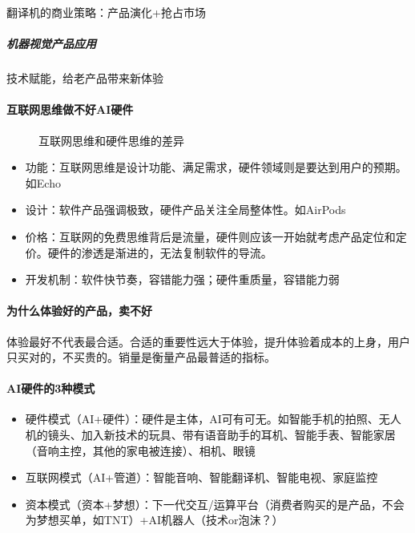 \documentclass[letterpaper,11pt,english]{sphinxmanual}
\begin{document}
翻译机的商业策略：产品演化+抢占市场


\subparagraph{机器视觉产品应用}
\label{\detokenize{chapter_project/AI_hardware:id12}}
技术赋能，给老产品带来新体验


\paragraph{互联网思维做不好AI硬件}
\label{\detokenize{chapter_project/AI_hardware:id13}}
\begin{figure}[H]
\centering
\capstart

\noindent{}
\caption{互联网思维和硬件思维的差异}\label{\detokenize{chapter_project/AI_hardware:id34}}\end{figure}
\begin{itemize}
\item {} 
功能：互联网思维是设计功能、满足需求，硬件领域则是要达到用户的预期。如Echo

\item {} 
设计：软件产品强调极致，硬件产品关注全局整体性。如AirPods

\item {} 
价格：互联网的免费思维背后是流量，硬件则应该一开始就考虑产品定位和定价。硬件的渗透是渐进的，无法复制软件的导流。

\item {} 
开发机制：软件快节奏，容错能力强；硬件重质量，容错能力弱

\end{itemize}


\paragraph{为什么体验好的产品，卖不好}
\label{\detokenize{chapter_project/AI_hardware:id14}}
体验最好不代表最合适。合适的重要性远大于体验，提升体验着成本的上身，用户只买对的，不买贵的。销量是衡量产品最普适的指标。


\paragraph{AI硬件的3种模式}
\label{\detokenize{chapter_project/AI_hardware:ai3}}\begin{itemize}
\item {} 
硬件模式（AI+硬件）：硬件是主体，AI可有可无。如智能手机的拍照、无人机的镜头、加入新技术的玩具、带有语音助手的耳机、智能手表、智能家居（音响主控，其他的家电被连接）、相机、眼镜

\item {} 
互联网模式（AI+管道）：智能音响、智能翻译机、智能电视、家庭监控

\item {} 
资本模式（资本+梦想）：下一代交互/运算平台（消费者购买的是产品，不会为梦想买单，如TNT）+AI机器人（技术or泡沫？）

\end{itemize}
\end{document}
